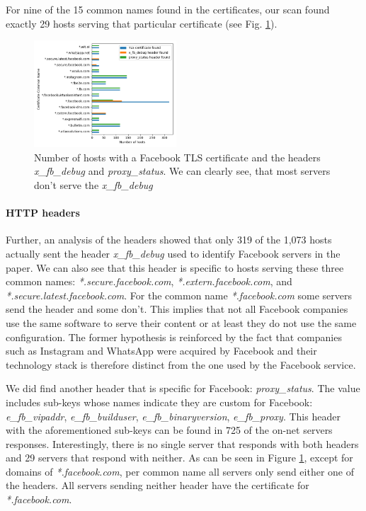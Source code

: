 \documentclass[sigconf,10pt,nonacm]{acmart}
\begin{document}
For nine of the 15 common names found in the certificates, our scan found exactly 29 hosts serving that particular certificate (see Fig. \ref{fig:hosts_per_characteristic}).

\begin{figure}[t]
    \centering
    \includegraphics[width=0.475\textwidth]{graphics/onnet_certs_headers.png}
    \caption[]{Number of hosts with a Facebook TLS certificate and the headers \textit{x\_fb\_debug} and \textit{proxy\_status}. We can clearly see, that most servers don't serve the \textit{x\_fb\_debug}}
    \label{fig:hosts_per_characteristic}
\end{figure}

\paragraph{HTTP headers}
Further, an analysis of the headers showed that only 319 of the 1,073 hosts actually sent the header \textit{x\_fb\_debug} used to identify Facebook servers in the paper. We can also see that this header is specific to hosts serving these three common names: \textit{*.secure.facebook.com}, \textit{*.extern.facebook.com}, and \textit{*.secure.latest.facebook.com}. For the common name \textit{*.facebook.com} some servers send the header and some don't. This implies that not all Facebook companies use the same software to serve their content or at least they do not use the same configuration. The former hypothesis is reinforced by the fact that companies such as Instagram and WhatsApp were acquired by Facebook and their technology stack is therefore distinct from the one used by the Facebook service.

We did find another header that is specific for Facebook: \textit{proxy\_status}. The value includes sub-keys whose names indicate they are custom for Facebook: \textit{e\_fb\_vipaddr}, \textit{e\_fb\_builduser}, \textit{e\_fb\_binaryversion}, \textit{e\_fb\_proxy}. This header with the aforementioned sub-keys can be found in 725 of the on-net servers responses. Interestingly, there is no single server that responds with both headers and 29 servers that respond with neither. As can be seen in Figure \ref{fig:hosts_per_characteristic}, except for domains of \textit{*.facebook.com}, per common name all servers only send either one of the headers. All servers sending neither header have the certificate for \textit{*.facebook.com}.
\end{document}
